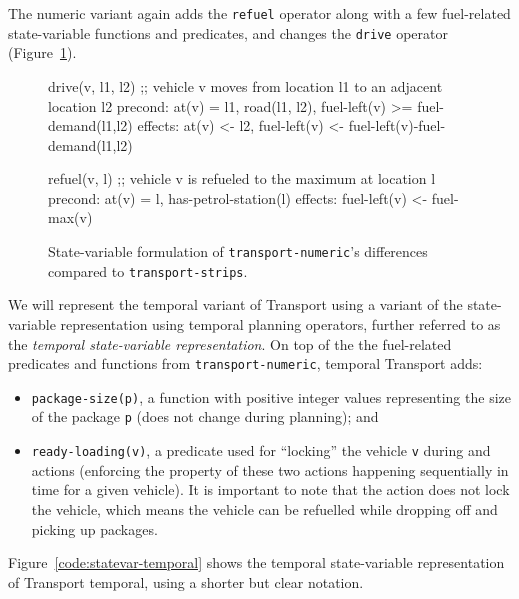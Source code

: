The numeric variant again adds the \verb+refuel+ operator along with
a few fuel-related state-variable functions and predicates, and changes 
the \verb+drive+ operator (Figure~\ref{code:statevar-numeric}).

\begin{figure}[tb]
\begin{code}
drive(v, l1, l2)
  ;; vehicle v moves from location l1 to an adjacent location l2
  precond: at(v) = l1, road(l1, l2), fuel-left(v) >= fuel-demand(l1,l2)
  effects: at(v) <- l2, fuel-left(v) <- fuel-left(v)-fuel-demand(l1,l2)
  
refuel(v, l)
  ;; vehicle v is refueled to the maximum at location l
  precond: at(v) = l, has-petrol-station(l)
  effects: fuel-left(v) <- fuel-max(v)
\end{code}
\caption[Partial state-variable formulation of \texttt{transport-numeric}.]{State-variable formulation of \texttt{transport-numeric}'s differences
compared to \texttt{transport-strips}.}
\label{code:statevar-numeric}
\end{figure}

We will represent the temporal variant of Transport using a variant of the state-variable representation using temporal planning operators, further referred to as the \textit{temporal state-variable representation}.
On top of the the fuel-related predicates and functions from \verb+transport-numeric+, temporal Transport adds:
\begin{itemize}
\item \verb+package-size(p)+, a function with positive integer values representing the size of the package \verb+p+ (does not change during planning); and
\item \verb+ready-loading(v)+, a predicate used for ``locking'' the vehicle \verb+v+ during \pickup{} and \drop{} actions (enforcing the property of these two actions happening sequentially in time for a given vehicle). It is important to note that the  action does not
lock the vehicle, which means the vehicle can be refuelled while dropping off and picking up packages.
\end{itemize}
Figure~\ref{code:statevar-temporal} shows the temporal state-variable representation of Transport temporal, using a shorter but clear notation.

